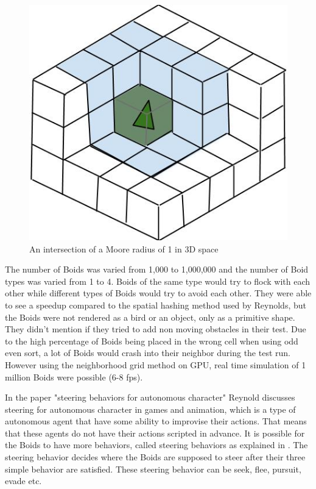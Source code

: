 \begin{figure}[H]
    \centering
    \includegraphics[width=0.5\linewidth]{images/3dgrid}
    \caption[Moore radius illustrated in 3D space]{An intersection of a Moore radius of 1 in 3D space}\label{fig:3dgrid}
\end{figure}

The number of Boids was varied from 1,000 to 1,000,000 and the number of Boid types was varied from 1 to 4. Boids of the same type would try to flock with each other while different types of Boids would try to avoid each other.
They were able to see a speedup compared to the spatial hashing method used by Reynolds, but the Boids were not rendered as a bird or an object, only as a primitive shape. They didn't mention if they tried to add non moving obstacles in their test. Due to the high percentage of Boids being placed in the wrong cell when using odd even sort, a lot of Boids would crash into their neighbor during the test run. However using the neighborhood grid method on GPU, real time simulation of 1 million Boids were possible (6-8 fps).

In the paper "steering behaviors for autonomous character" Reynold discusses steering for autonomous character in games and animation, which is a type of autonomous agent that have some ability to improvise their actions. That means that these agents do not have their actions scripted in advance.
It is possible for the Boids to have more behaviors, called steering behaviors as explained in \citep{Reynolds1999}. The steering behavior decides where the Boids are supposed to steer after their three simple behavior are satisfied.  These steering behavior can be seek, flee, pursuit, evade etc. 

